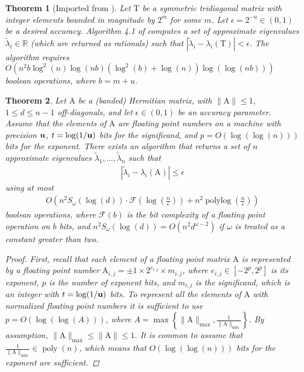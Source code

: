 \documentclass{article}
\newcommand{\labs}{\left|}
\newcommand{\rabs}{\right|}
\newcommand{\lcurly}{\left\{}
\newcommand{\rcurly}{\right\}}
\newcommand{\lpar}{\left(}
\newcommand{\rpar}{\right)}
\newtheorem{theorem}{Theorem}[section]
\DeclareMathOperator{\poly}{poly}
\DeclareMathOperator{\polylog}{polylog}
\newcommand\matA{\boldsymbol{\mathrm{A}}}
\newcommand\matT{\boldsymbol{\mathrm{T}}}
\newcommand{\umach}{\textbf{\textup{u}}}
\newcommand{\matmulexponent}{\omega}
\newcommand{\flopcost}{\mathcal{F}}
\begin{document}
\begin{theorem}[Imported from \cite{bini1991parallel,bini1998computing}]
Let $\matT$ be a symmetric tridiagonal matrix with integer elements bounded in magnitude by $2^m$ for some $m$. Let $\epsilon=2^{-u}\in(0,1)$ be a desired accuracy. Algorithm 4.1 of \cite{bini1991parallel} computes a set of approximate eigenvalues $\widetilde\lambda_i\in\mathbb{R}$ (which are returned as rationals) such that
$
    \labs \widetilde\lambda_i-\lambda_i(\matT) \rabs < \epsilon.
$
The algorithm requires
$
    O\lpar
        n^2b\log^2(n)\log(nb)(\log^2(b)+\log(n))\log(\log(nb))
    \rpar
$
boolean operations, where $b=m+u$.
\label{theorem:bini_pan_tridiagonal_eigenvalues}
\end{theorem}

\begin{theorem}
    \label{theorem:hermitian_eigenvalues}
    Let $\matA$ be a (banded) Hermitian matrix, with $\|\matA\|\leq 1$, $1\leq d\leq n-1$ off-diagonals, and let $\epsilon\in(0,1)$ be an  accuracy parameter. Assume that the elements of $\matA$ are floating point numbers on a machine with precision $\umach$, $t=\log(1/\umach)$ bits for the significand, and $p=O(\log(\log(n)))$ bits for the exponent. There exists an algorithm that returns a set of $n$ approximate eigenvalues $\widetilde\lambda_1,\ldots,\widetilde\lambda_n$ such that
    \begin{align*}
        \labs \widetilde\lambda_i - \lambda_i(\matA) \rabs
        \leq
        \epsilon
    \end{align*}
    using at most 
    \begin{align*}
        O\lpar
            n^2S_{\matmulexponent}(\log(d))\cdot \flopcost(\log(\tfrac{n}{\epsilon}))
            +
            n^2\polylog(\tfrac{n}{\epsilon})
        \rpar
    \end{align*}
    boolean operations, where $\flopcost(b)$ is the bit complexity of a floating point operation on $b$ bits, and  $n^2S_{\matmulexponent}(\log(d))=O(n^2d^{\matmulexponent-2})$ if $\omega$ is treated as a constant greater than two.
    \begin{proof}
        First, recall that each element of a floating point matrix $\matA$ is represented by a floating point number $\matA_{i,j}=\pm 1\times 2^{e_{i,j}}\times m_{i,j}$, where $e_{i,j}\in[-2^{p},2^p]$ is its exponent, $p$ is the number of exponent bits, and $m_{i,j}$ is the significand, which is an integer with $t=\log(1/\umach)$ bits. To represent all the elements of $\matA$ with normalized floating point numbers it is sufficient to use $p=O\lpar \log(\log(A))\rpar$, where $A=\max\lcurly\|\matA\|_{\max}, \frac{1}{\|\matA\|_{\min}}\rcurly$. By assumption, $\|\matA\|_{\max}\leq \|\matA\|\leq 1$. It is common to assume that $\frac{1}{\|\matA\|_{\min}}\in\poly(n)$, which means that $O(\log(\log(n)))$ bits for the exponent are sufficient.


\end{proof}
\end{theorem}
\end{document}
